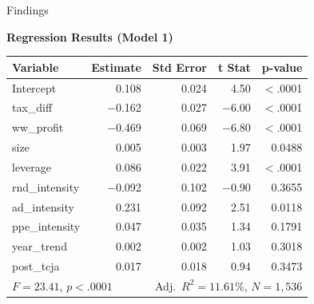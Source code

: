 \documentclass{beamer}
\begin{document}
\begin{frame}{Findings}
\centerline{\large\textbf{Regression Results (Model 1)}}
\vspace{0.1cm}
{\footnotesize
\begin{table}
\centering
\begin{tabular}{lrrrr}
\toprule
\textbf{Variable} & \textbf{Estimate} & \textbf{Std Error} & \textbf{t Stat} & \textbf{p-value} \\
\midrule
Intercept       &  0.108 & 0.024 &  4.50 & $<$.0001 \\
tax\_diff       & $-$0.162 & 0.027 & $-$6.00 & $<$.0001 \\
ww\_profit      & $-$0.469 & 0.069 & $-$6.80 & $<$.0001 \\
size            &  0.005 & 0.003 &  1.97 & 0.0488 \\
leverage        &  0.086 & 0.022 &  3.91 & $<$.0001 \\
rnd\_intensity  & $-$0.092 & 0.102 & $-$0.90 & 0.3655 \\
ad\_intensity   &  0.231 & 0.092 &  2.51 & 0.0118 \\
ppe\_intensity  &  0.047 & 0.035 &  1.34 & 0.1791 \\
year\_trend     &  0.002 & 0.002 &  1.03 & 0.3018 \\
post\_tcja      &  0.017 & 0.018 &  0.94 & 0.3473 \\
\midrule
\multicolumn{2}{l}{$F = 23.41$, $p < .0001$} & \multicolumn{3}{r}{Adj.\ $R^2 = 11.61\%$, $N = 1{,}536$} \\
\bottomrule
\end{tabular}
\end{table}
}
\end{frame}
\end{document}
